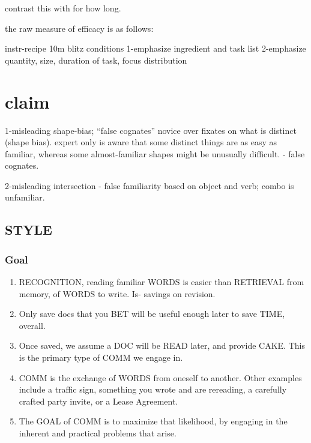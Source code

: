 \documentclass[
]{book}
\providecommand{\tightlist}{%
  \setlength{\itemsep}{0pt}\setlength{\parskip}{0pt}}
\begin{document}
contrast this with
for how long.

the raw measure of efficacy is as follows:

instr-recipe
10m blitz conditions
1-emphasize ingredient and task list
2-emphasize quantity, size, duration of task, focus distribution

\hypertarget{claim}{%
\chapter{claim}\label{claim}}

1-misleading shape-bias; ``false cognates''
novice over fixates on what is distinct (shape bias).
expert only is aware that some distinct things are as easy as familiar,
whereas some almost-familiar shapes might be unusually difficult.
- false cognates.

2-misleading intersection
- false familiarity based on object and verb; combo is unfamiliar.

\hypertarget{style}{%
\section{STYLE}\label{style}}

\hypertarget{goal}{%
\subsection{Goal}\label{goal}}

\begin{enumerate}
\def\labelenumi{\arabic{enumi}.}
\setcounter{enumi}{1}
\tightlist
\item
  RECOGNITION, reading familiar WORDS is easier than RETRIEVAL from
  memory, of WORDS to write. Is- savings on revision.
\item
  Only save docs that you BET will be useful enough later to save TIME,
  overall.
\item
  Once saved, we assume a DOC will be READ later, and provide CAKE.
  This is the primary type of COMM we engage in.
\item
  COMM is the exchange of WORDS from oneself to another. Other
  examples include a traffic sign, something you wrote and are
  rereading, a carefully crafted party invite, or a Lease Agreement.
\item
  The GOAL of COMM is to maximize that likelihood, by engaging in the inherent and practical problems that arise.
\end{enumerate}
\end{document}
